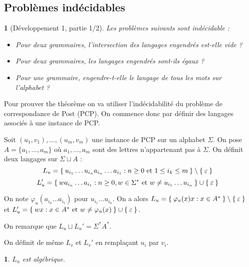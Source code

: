 \documentclass[11pt,a4paper]{article}
\theoremstyle{plain}
\theoremstyle{definition}
\theoremstyle{definition}
\theoremstyle{remark}
\theoremstyle{remark}
\theoremstyle{plain}
\newtheorem{lem}[thm]{\protect\lemmaname}
\theoremstyle{plain}
\newtheorem{prop}[thm]{\protect\propositionname}
\theoremstyle{plain}
\theoremstyle{remark}
\providecommand{\lemmaname}{Lemme}
\providecommand{\propositionname}{Proposition}
\begin{document}



\subsection{Problèmes indécidables}
\begin{prop}[Développement 1, partie 1/2]\label{thindec}
	Les problèmes suivants sont indécidable : %
	\begin{itemize}
		\item[1.] Pour deux grammaires, l'intersection des langages engendrés est-elle vide ?
		\item[2.] Pour deux grammaires, les langages engendrés sont-ils égaux ?
		\item[3.] Pour une grammaire, engendre-t-elle le langage de tous les mots sur l'alphabet ?
	\end{itemize}
\end{prop}

Pour prouver the théorème on va utiliser l'indécidabilité du  problème de correspondance de Post (PCP). On commence donc par définir des langages associés à une instance de PCP.

Soit $(u_1,v_1),\dots,(u_m,v_m)$ une instance de PCP sur un alphabet $\Sigma$. On pose $A=\{a_1,\dots, a_m\}$ où $a_1,\dots,a_m$ sont des lettres n'appartenant pas à $\Sigma$. On définit deux langages sur $\Sigma \sqcup A$ :
$$L_u=\Set{u_{i_1}\dots u_{i_n}a_{i_n}\dots a_{i_1} : n\ge 0\text{ et }1\le i_k \le m}\setminus \Set{\varepsilon}$$
$$L_u'=\Set{wa_{i_n}\dots a_{i_1} : n\ge 0, w\in\Sigma^*\text{ et }w\not=u_{i_1}\dots u_{i_n}}\cup \Set{\varepsilon}$$

On note $\varphi_u(a_{i_n}\dots a_{i_1})$ pour $u_{i_1}\dots u_{i_n}$. On a alors $L_u=\Set{\varphi_u(x)x : x \in A^*}\setminus \Set{\varepsilon}$ et $L_u'=\Set{wx : x \in A^*\text{ et } w\not=\varphi_u(x)}\cup \Set{\varepsilon}$.

On remarque que $L_u \sqcup L_u' = \Sigma^*A^*$.

On définit de même $L_v$ et $L_v'$ en remplaçant $u_i$ par $v_i$.

\begin{lem}
	$L_u$ est algébrique.
\end{lem}
\end{document}
